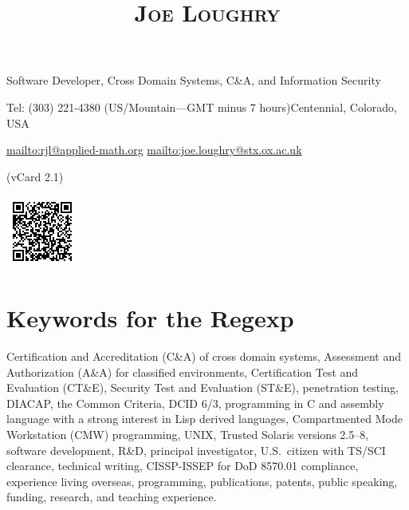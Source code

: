 \documentclass[letterpaper]{article}
\date{}
\title{\textsc{Joe Loughry}}
\author{}
\begin{document}
\maketitle

\vspace{-23mm}

\begin{minipage}[b]{0.835\textwidth}
{\large Software Developer, Cross Domain Systems, C\&A, and Information Security}

\vspace{2mm}
Tel: (303) 221-4380 (US/Mountain---GMT minus 7 hours)\hfill Centennial, Colorado, USA

\url{mailto:rjl@applied-math.org} \hfill \url{mailto:joe.loughry@stx.ox.ac.uk}

\vspace{5mm}
\hfill {\scriptsize (vCard 2.1)}
\end{minipage}
\begin{minipage}{0.8in}\vspace{-20mm}
\includegraphics[scale=0.9]{J_Loughry_vCard_QR_med.png}
\end{minipage}

\vspace{-11mm}
\section*{Keywords for the Regexp}

Certification and Accreditation (C\&A) of cross domain systems,
Assessment and Authorization (A\&A) for classified environments,
Certification Test and Evaluation (CT\&E),
Security Test and Evaluation (ST\&E),
penetration testing,
DIACAP,
the Common Criteria,
DCID 6/3,
programming in C and assembly language with a strong interest in Lisp derived languages,
Compartmented Mode Workstation (CMW) programming,
UNIX,
Trusted Solaris versions 2.5--8,
software development,
R\&D,
principal investigator,
U.S.\ citizen with TS/SCI clearance,
technical writing,
CISSP-ISSEP for DoD 8570.01 compliance,
experience living overseas,
programming,
publications,
patents,
public speaking,
funding,
research,
and teaching experience.

\vspace{-3mm}
\end{document}
